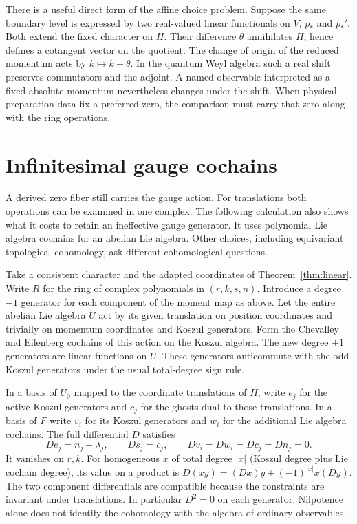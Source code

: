 \documentclass[11pt,letterpaper]{article}
\begin{document}
There is a useful direct form of the affine choice problem. Suppose the same boundary level is
expressed by two real-valued linear functionals on $V$, $p_*$ and $p_*'$. Both extend the
fixed character on $H$. Their difference $\theta$ annihilates $H$, hence defines a cotangent
vector on the quotient. The change of origin of the reduced momentum acts by $k\mapsto
k-\theta$. In the quantum Weyl algebra such a real shift preserves commutators and the
adjoint. A named observable interpreted as a fixed absolute momentum nevertheless changes
under the shift. When physical preparation data fix a preferred zero, the comparison must
carry that zero along with the ring operations.

\section{Infinitesimal gauge cochains}
\label{sec:cochains}
A derived zero fiber still carries the gauge action. For translations both operations can be
examined in one complex. The following calculation also shows what it costs to retain an
ineffective gauge generator. It uses polynomial Lie algebra cochains for an abelian Lie
algebra. Other choices, including equivariant topological cohomology, ask different
cohomological questions.

Take a consistent character and the adapted coordinates of Theorem~\ref{thm:linear}. Write $R$
for the ring of complex polynomials in $(r,k,s,n)$. Introduce a degree $-1$ generator for each
component of the moment map as above. Let the entire abelian Lie algebra $U$ act by its given
translation on position coordinates and trivially on momentum coordinates and Koszul
generators. Form the Chevalley and Eilenberg cochains of this action on the Koszul algebra.
The new degree $+1$ generators are linear functions on $U$. These generators anticommute with
the odd Koszul generators under the usual total-degree sign rule.

In a basis of $U_0$ mapped to the coordinate translations of $H$, write $e_j$ for the active
Koszul generators and $c_j$ for the ghosts dual to those translations. In a basis of $F$ write
$v_i$ for its Koszul generators and $w_i$ for the additional Lie algebra cochains. The full
differential $D$ satisfies
\begin{equation}
 D e_j=n_j-\lambda_j,\qquad D s_j=c_j,\qquad
 Dv_i=Dw_i=Dc_j=Dn_j=0 .
 \label{eq:BRST}
\end{equation}
It vanishes on $r,k$. For homogeneous $x$ of total degree $|x|$ (Koszul degree plus Lie
cochain degree), its value on a product is $D(xy)=(Dx)y+(-1)^{|x|}x(Dy)$.
The two component differentials are
compatible because the constraints are invariant under translations. In particular $D^2=0$ on
each generator. Nilpotence alone does not identify the cohomology with the algebra of ordinary
observables.
\end{document}
